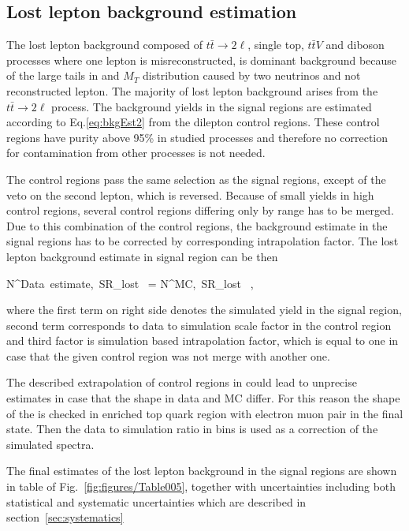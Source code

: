 \subsection{Lost lepton background estimation}

The lost lepton background composed of $t\bar{t} \to 2\ell$, single top, $t\bar{t}V$ and diboson processes where one lepton is misreconstructed, is dominant background because of the large tails in \MET and $M_{T}$ distribution caused by two neutrinos and not reconstructed lepton. The majority of lost lepton background arises from the $t\bar{t} \to 2\ell$ process. The background yields in the signal regions are  estimated according to Eq.\ref{eq:bkgEst2} from the dilepton control regions. These control regions have purity above 95\% in studied processes and therefore no correction for contamination from other processes is not needed. 

The control regions pass the same selection as the signal regions, except of the veto on the second lepton, which is reversed. Because of small yields in high \MET control regions, several control regions differing only by \MET range has to be merged. Due to this combination of the control regions, the background estimate in the signal regions has to be corrected by corresponding intrapolation factor. The lost lepton background estimate in signal region can be then 

{
N^{Data~estimate,~SR}_{lost~\ell}  = N^{MC,~SR}_{lost~\ell} \times  {} \times {},
}

where the first term on right side denotes the simulated yield in the signal region, second term corresponds to data to simulation scale factor in the control region and third factor is simulation based intrapolation factor, which is equal to one in case that the given control region was not merge with another one.

The described extrapolation of control regions in \MET could lead to unprecise estimates in case that the \MET shape in data and MC differ. For this reason the shape of the \MET is checked in enriched top quark region with electron muon pair in the final state. Then the data to simulation ratio in \MET bins is used as a correction of the simulated \MET spectra. 

The final estimates of the lost lepton background in the signal regions are shown in table of Fig.~\ref{fig:figures/Table005}, together with uncertainties including both statistical and systematic uncertainties which are described in section~\ref{sec:systematics}

